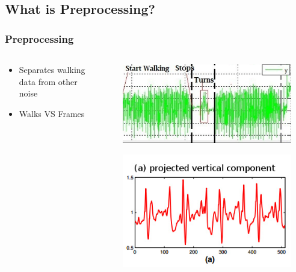 \documentclass{beamer}
\begin{document}
\subsection{What is Preprocessing?}
\begin{frame}
  \frametitle{Preprocessing}

  \begin{columns}
  \begin{column}{0.5\textwidth}
  \begin{itemize}
    \item Separates walking data from other noise
    \linebreak
    \item Walks VS Frames
  \end{itemize}
  \end{column}

\begin{column}{0.02\textwidth}
\end{column}

\begin{column}{0.5\textwidth}

\includegraphics[width=0.91\textwidth]{Illustrations/preprocessingexample.png}

\includegraphics[width=0.91\textwidth]{Illustrations/frame.jpg}

\end{column}  
  
  
  \end{columns}
\end{frame}
\end{document}

